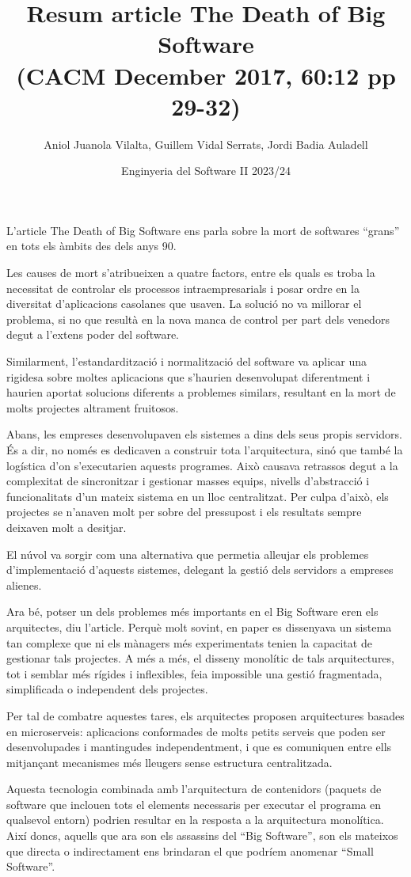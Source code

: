 \documentclass[11pt,a4paper]{article}
\title{Resum article The Death of Big Software \\(CACM December 2017, 60:12 pp 29-32)}
\date{Enginyeria del Software II 2023/24}
\author{Aniol Juanola Vilalta, Guillem Vidal Serrats, Jordi Badia Auladell}
\begin{document}
\maketitle

L’article The Death of Big Software ens parla sobre la mort de softwares “grans” en tots els àmbits des dels anys 90. 

Les causes de mort s’atribueixen a quatre factors, entre els quals es troba la necessitat de controlar els processos intraempresarials i posar ordre en la diversitat d’aplicacions casolanes que usaven. La solució no va millorar el problema, si no que resultà en la nova manca de control per part dels venedors degut a l’extens poder del software.

Similarment, l'estandardització i normalització del software va aplicar una rigidesa sobre moltes aplicacions que s’haurien desenvolupat diferentment i haurien aportat solucions diferents a problemes similars, resultant en la mort de molts projectes altrament fruitosos.


Abans, les empreses desenvolupaven els sistemes a dins dels seus propis servidors. És a dir, no només es dedicaven a construir tota l'arquitectura, sinó que també la logística d'on s'executarien aquests programes. Això causava retrassos degut a la complexitat de sincronitzar i gestionar masses equips, nivells d'abstracció i funcionalitats d'un mateix sistema en un lloc centralitzat. Per culpa d'això, els projectes se n'anaven molt per sobre del pressupost i els resultats sempre deixaven molt a desitjar.

El núvol va sorgir com una alternativa que permetia alleujar els problemes d'implementació d'aquests sistemes, delegant la gestió dels servidors a empreses alienes.

Ara bé, potser un dels problemes més importants en el Big Software eren els arquitectes, diu l'article. Perquè molt sovint, en paper es dissenyava un sistema tan complexe que ni els mànagers més experimentats tenien la capacitat de gestionar tals projectes. A més a més, el disseny monolític de tals arquitectures, tot i semblar més rígides i inflexibles, feia impossible una gestió fragmentada, simplificada o independent dels projectes.


Per tal de combatre aquestes tares, els arquitectes proposen arquitectures basades en microserveis: aplicacions conformades de molts petits serveis que poden ser desenvolupades i mantingudes independentment, i que es comuniquen entre ells mitjançant mecanismes més lleugers sense estructura centralitzada.

Aquesta tecnologia combinada amb l'arquitectura de contenidors (paquets de software que inclouen tots el elements necessaris per executar el programa en qualsevol entorn) podrien resultar en la resposta a la arquitectura monolítica.
Així doncs, aquells que ara son els assassins del “Big Software”, son els mateixos que directa o indirectament ens brindaran el que podríem anomenar “Small Software”.
\end{document}
